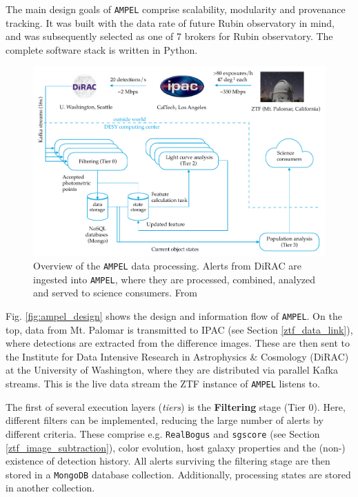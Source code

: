 \documentclass[
    a4paper, %
    fontsize=10pt, %
    twoside=true, %
    numbers=noenddot, %
    fontmethod=tex,
]{kaobook}
\begin{document}
The main design goals of \texttt{AMPEL} comprise scalability, modularity and provenance tracking. It was built with the data rate of future Rubin observatory  in mind, and was subsequently selected as one of 7 brokers for Rubin observatory. The complete software stack is written in Python.


\begin{figure}[h!]
    \includegraphics{fu/ampel_design.pdf}
    \caption[\texttt{AMPEL} overview]{Overview of the \texttt{AMPEL} data processing. Alerts from DiRAC are ingested into \texttt{AMPEL}, where they are processed, combined, analyzed and served to science consumers. From \cite{Nordin2019}}
\end{figure}

Fig. \ref{fig:ampel_design} shows the design and information flow of \texttt{AMPEL}. On the top, data from Mt. Palomar is transmitted to IPAC (see Section \ref{ztf_data_link}), where detections are extracted from the difference images. These are then sent to the Institute for Data Intensive Research in Astrophysics \& Cosmology (DiRAC) at the University of Washington, where they are distributed via parallel Kafka streams. This is the live data stream the ZTF instance of \texttt{AMPEL} listens to.

The first of several execution layers (\textit{tiers}) is the \textbf{Filtering} stage (Tier 0). Here, different filters can be implemented, reducing the large number of alerts by different criteria. These comprise e.g. \texttt{RealBogus} and \texttt{sgscore} (see Section \ref{ztf_image_subtraction}), color evolution, host galaxy properties and the (non-) existence of detection history. All alerts surviving the filtering stage are then stored in a \texttt{MongoDB} database collection. Additionally, processing states are stored in another collection.
\end{document}
